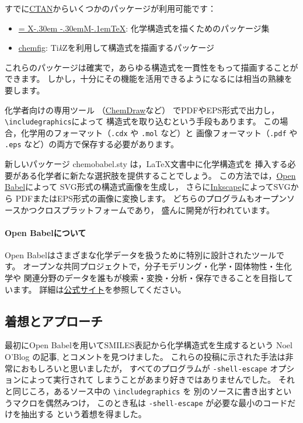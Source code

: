 \documentclass[12pt]{ltjsarticle}
\def\XyM{\ifnum\fam=-1\relax\fam=0\relax\fi\TestCount=\fam
  X\kern-.30em\smash{\raise.50ex\hbox{$\fam\TestCount\Upsilon$}}%
  \kern-.30em{M}}
\def\XyMTeX{\XyM\kern-.1em\TeX}
\def\Lpack#1{\textsf{#1}}
\def\TikZ{Ti\textit{k}Z}
\begin{document}
すでに\href{http://www.ctan.org/}{CTAN}からいくつかのパッケージが利用可能です：
\begin{itemize}
  \item \href{http://www.ctan.org/pkg/xymtex}{\XyMTeX}:
    化学構造式を描くためのパッケージ集
  \item \href{http://www.ctan.org/pkg/chemfig}{\Lpack{chemfig}}:
    \TikZ を利用して構造式を描画するパッケージ
\end{itemize}
これらのパッケージは確実で，あらゆる構造式を一貫性をもって描画することができます。
しかし，十分にその機能を活用できるようになるには相当の熟練を要します。

化学者向けの専用ツール
（\href{http://www.cambridgesoft.com/Ensemble_for_Chemistry/ChemDraw/}{ChemDraw}など）
でPDFやEPS形式で出力し，\verb|\includegraphics|によって
構造式を取り込むという手段もあります。
この場合，化学用のフォーマット（\verb|.cdx| や \verb|.mol| など）と
画像フォーマット（\verb|.pdf| や \verb|.eps| など）の両方で保存する必要があります。

新しいパッケージ \Lpack{chemobabel.sty} は，\LaTeX 文書中に化学構造式を
挿入する必要がある化学者に新たな選択肢を提供することでしょう。
この方法では，\href{http://openbabel.org/}{Open Babel}によって
SVG形式の構造式画像を生成し，
さらに\href{https://inkscape.org/ja/}{Inkscape}によってSVGから
PDFまたはEPS形式の画像に変換します。
どちらのプログラムもオープンソースかつクロスプラットフォームであり，
盛んに開発が行われています。

\paragraph{Open Babelについて}

Open Babelはさまざまな化学データを扱うために特別に設計されたツールです。
オープンな共同プロジェクトで，分子モデリング・化学・固体物性・生化学や
関連分野のデータを誰もが検索・変換・分析・保存できることを目指しています。
詳細は\href{http://openbabel.org/}{公式サイト}を参照してください。

\clearpage

\subsection{着想とアプローチ}


最初にOpen Babelを用いてSMILES表記から化学構造式を生成するという
Noel O'Blog の記事\cite{NOB1}, \cite{NOB2}とコメント\cite{JLA}を見つけました。
これらの投稿に示された手法は非常におもしろいと思いましたが，
すべてのプログラムが \verb|-shell-escape| オプションによって実行されて
しまうことがあまり好きではありませんでした。
それと同じころ，あるソース中の \verb|\includegraphics| を
別のソースに書き出すというマクロ\cite{OKU}を偶然みつけ，
このとき私は \verb|-shell-escape| が必要な最小のコードだけを抽出する
という着想を得ました。
\end{document}

